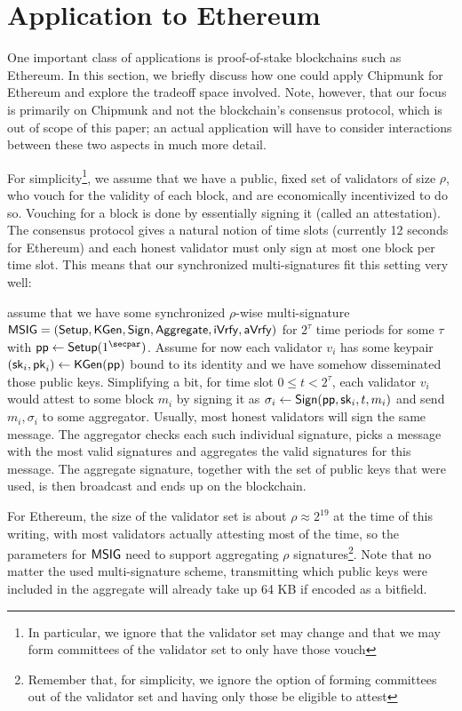 \section{Application to Ethereum}\label{sec:ethereum}

One important class of applications is proof-of-stake blockchains such as Ethereum. %
In this section, we briefly discuss how one could apply Chipmunk for Ethereum and explore the tradeoff space involved.
Note, however, that our focus is primarily on Chipmunk and not the blockchain's consensus protocol, which is out of scope of this paper;
an actual application will have to consider interactions between these two aspects in much more detail.

For simplicity\footnote{In particular, we ignore that the validator set may change and that we may form committees of the validator set to only have those vouch}, we assume that we have a public, fixed set of validators of size $\rho$, who vouch for the validity of each block, and are economically incentivized to do so.
Vouching for a block is done by essentially signing it (called an attestation). The consensus protocol gives a natural notion of time slots (currently 12 seconds for Ethereum) and each honest validator must only sign at most one block per time slot. This means that our synchronized multi-signatures fit this setting very well:

assume that we have some synchronized $\rho$-wise multi-signature $\mathsf{MSIG} = (\mathsf{Setup}, \mathsf{KGen}, \mathsf{Sign}, \allowbreak \mathsf{Aggregate},\allowbreak \mathsf{iVrfy}, \mathsf{aVrfy})$ for $2^{\tau}$ time periods for some $\tau$ with $\params\gets\setup(1^{\secpar})$. Assume for now each validator $v_i$ has some keypair $(\mathsf{sk}_i,\mathsf{pk}_i)\gets \mathsf{KGen}(\mathsf{pp})$ bound to its identity and we have somehow disseminated those public keys.
Simplifying a bit, for time slot $0\leq t <2^\tau$, each validator $v_i$ would attest to some block $m_i$ by signing it as $\sigma_i\gets\mathsf{Sign}(\mathsf{pp},\mathsf{sk}_i,t,m_i)$ and send $m_i, \sigma_i$ to some aggregator. Usually, most honest validators will sign the same message. The aggregator checks each such individual signature, picks a message with the most valid signatures and aggregates the valid signatures for this message. The aggregate signature, together with the set of public keys that were used, is then broadcast and ends up on the blockchain.

For Ethereum, the size of the validator set is about $\rho\approx 2^{19}$ at the time of this writing, with most validators actually attesting most of the time, so the parameters for $\mathsf{MSIG}$ need to support aggregating $\rho$ signatures\footnote{Remember that, for simplicity, we ignore the option of forming committees out of the validator set and having only those be eligible to attest}. Note that no matter the used multi-signature scheme, transmitting which public keys were included in the aggregate will already take up 64 KB if encoded as a bitfield.

